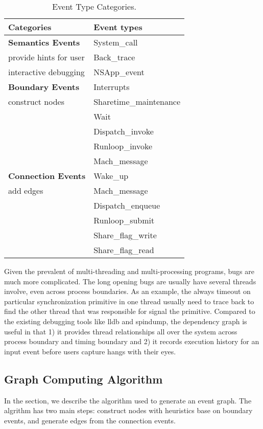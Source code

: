 \begin{table}[h]
  \centering
  \begin{tabularx}{\columnwidth}{|X|X|}
  	\hline
    \textbf{Categories} & \textbf{Event types}\\
	\hline
	\hline
    {\bf Semantics Events} & System\_call\\
    provide hints for user & Back\_trace\\					   
	interactive debugging  & NSApp\_event\\
    \hline
    {\bf Boundary Events} & Interrupts\\
	construct nodes & Sharetime\_maintenance\\
	& Wait\\
	& Dispatch\_invoke\\
    & Runloop\_invoke\\
	& Mach\_message\\
    \hline
	{\bf Connection Events} & Wake\_up\\
    add edges & Mach\_message\\
    & Dispatch\_enqueue\\
    & Runloop\_submit\\
	& Share\_flag\_write\\
	& Share\_flag\_read\\
    \hline
  \end{tabularx}
  \caption{Event Type Categories. }
  \label{table:event_types}
\end{table}

Given the prevalent of multi-threading and multi-processing programs, bugs are
much more complicated. The long opening bugs are usually have several threads
involve, even across process boundaries. As an example, the always timeout on
particular synchronization primitive in one thread usually need to trace back to
find the other thread that was responsible for signal the primitive. Compared
to the existing debugging tools like lldb and spindump, the dependency graph is
useful in that 1) it provides thread relationships all over the system across
process boundary and timing boundary and 2) it records execution history for an
input event before users capture hangs with their eyes.

\subsection{Graph Computing Algorithm}

In the section, we describe the algorithm \xxx used to generate an event graph.
The algrithm has two main steps: construct nodes with heuristics base on
boundary events, and generate edges from the connection events.

